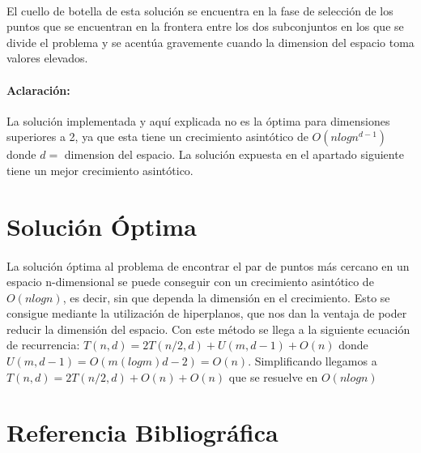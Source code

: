 \documentclass{article}
\begin{document}
		\paragraph{}
		El cuello de botella de esta solución se encuentra en la fase de selección de los puntos que se encuentran en la frontera entre los dos subconjuntos en los que se divide el problema y se acentúa gravemente cuando la dimension del espacio toma valores elevados.
		
		\paragraph{Aclaración:}
		La solución implementada y aquí explicada no es la óptima para dimensiones superiores a 2, ya que esta tiene un crecimiento asintótico de $O(nlogn^{d-1})$ donde $d = $ dimension del espacio. La solución expuesta en el apartado siguiente tiene un mejor crecimiento asintótico.
		
\section{Solución Óptima}
	\paragraph{}
	La solución óptima al problema de encontrar el par de puntos más cercano en un espacio n-dimensional se puede conseguir con un crecimiento asintótico de $O(nlogn)$, es decir, sin que dependa la dimensión en el crecimiento. Esto se consigue mediante la utilización de hiperplanos, que nos dan la ventaja de poder reducir la dimensión del espacio. Con este método se llega a la siguiente ecuación de recurrencia:
	$T(n, d) = 2T(n/2, d) + U(m, d - 1) + O(n)$ donde $U(m, d-1)=O(m (logm) d - 2) = O(n)$. Simplificando llegamos a $T(n,d)=2T(n/2,d)+O(n)+O(n)$ que se resuelve en $O(nlogn)$ 

\section{Referencia Bibliográfica}
\end{document}
